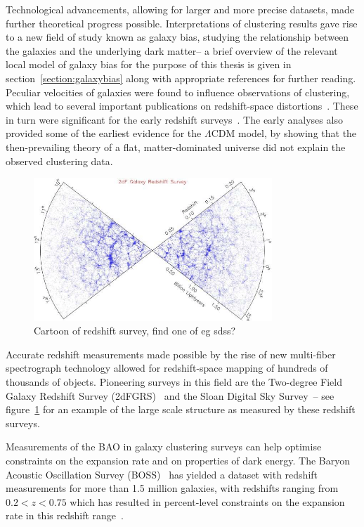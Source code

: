 Technological advancements, allowing for larger and more precise datasets, made further theoretical progress possible. Interpretations of clustering results gave rise to a new field of study known as galaxy bias, studying the relationship between the galaxies and the underlying dark matter-- a brief overview of the relevant local model of galaxy bias for the purpose of this thesis is given in section~\ref{section:galaxybias} along with appropriate references for further reading. Peculiar velocities of galaxies were found to influence observations of clustering, which lead to several important publications on redshift-space distortions~\cite{Kaiser:1987qv}. These in turn were significant for the early redshift surveys~\cite{Cole:1994wf,Loveday:1995gk,Tadros:1999ky}. The early analyses also provided some of the earliest evidence for the $\Lambda$CDM model, by showing that the then-prevailing theory of a flat, matter-dominated universe did not explain the observed clustering data.

\begin{figure}[ht]
	\centering
	\includegraphics[width=0.8\textwidth]{fig/placeholder_redshiftsurvey.png}
	\caption{Cartoon of redshift survey, find one of eg sdss?}
	\label{fig:redshiftsurveypicture}
\end{figure}

Accurate redshift measurements made possible by the rise of new multi-fiber spectrograph technology allowed for redshift-space mapping of hundreds of thousands of objects. Pioneering surveys in this field are the Two-degree Field Galaxy Redshift Survey (2dFGRS)~\cite{2DFGRS:2001zay} and the Sloan Digital Sky Survey~\cite{SDSS:2000hjo}-- see figure~\ref{fig:redshiftsurveypicture} for an example of the large scale structure as measured by these redshift surveys.

Measurements of the BAO in galaxy clustering surveys can help optimise constraints on the expansion rate and on properties of dark energy. The Baryon Acoustic Oscillation Survey (BOSS)~\cite{Dawson:2012} has yielded a dataset with redshift measurements for more than 1.5 million galaxies, with redshifts ranging from $0.2 < z < 0.75$ which has resulted in percent-level constraints on the expansion rate in this redshift range~\cite{BOSS:2016wmc}. 


